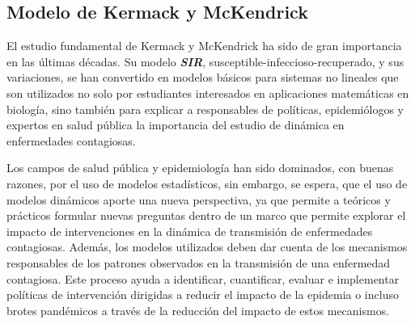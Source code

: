 \documentclass[journal]{IEEEtran}
\begin{document}
\subsection{Modelo de Kermack y McKendrick}

El estudio fundamental de Kermack \cite{Ross} y McKendrick \cite{Kermack} ha sido de gran importancia en las últimas décadas. Su modelo \textbf{\textit{SIR}}, susceptible-infeccioso-recuperado, y sus variaciones, 
se han convertido en modelos básicos para sistemas no lineales que son utilizados no solo por estudiantes interesados en aplicaciones matemáticas en biología,
sino también para explicar a responsables de políticas, epidemiólogos y expertos en salud pública la importancia del estudio de dinámica en enfermedades contagiosas.\newline

Los campos de salud pública y epidemiología han sido dominados, con buenas razones, por el uso de modelos estadísticos, sin embargo, se espera,
que el uso de modelos dinámicos aporte una nueva perspectiva, ya que permite a teóricos y prácticos formular nuevas preguntas dentro de un marco que permite explorar el impacto de intervenciones en la dinámica de transmisión de enfermedades contagiosas. 
Además, los modelos utilizados deben dar cuenta de los mecanismos responsables de los patrones observados en la transmisión de una enfermedad contagiosa.
Este proceso ayuda a identificar, cuantificar, evaluar e implementar políticas de intervención dirigidas a reducir el impacto de la epidemia o incluso brotes pandémicos a través de la reducción del impacto de estos mecanismos.
\end{document}
